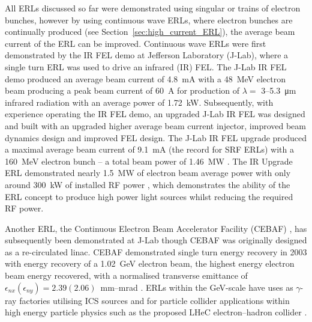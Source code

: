 \documentclass[../main.tex]{subfiles}
\begin{document}
All ERLs discussed so far were demonstrated using singular or trains of electron bunches, however by using continuous wave ERLs, where electron bunches are continually produced (see Section~\ref{sec:high_current_ERL}), the average beam current of the ERL can be improved. Continuous wave ERLs were first demonstrated \cite{neil2000sustained} by the IR FEL demo \cite{benson1999first,neil2000sustained} at Jefferson Laboratory (J-Lab), where a single turn ERL was used to drive an infrared (IR) FEL. The J-Lab IR FEL demo produced an average beam current of 4.8~\si{\milli\ampere} with a 48~\si{\mega\electronvolt} electron beam producing a peak beam current of 60~\si{\ampere} for production of $\lambda =$ 3--5.3~\si{\micro\meter} infrared radiation with an average power of 1.72~\si{\kilo\watt}. Subsequently, with experience operating the IR FEL demo, an upgraded J-Lab IR FEL was designed \cite{benson2002have} and built \cite{behre2004first} with an upgraded higher average beam current injector, improved beam dynamics design and improved FEL design. The J-Lab IR FEL upgrade produced a maximal average beam current of 9.1~\si{\milli\ampere} (the record for SRF ERLs) with a 160~\si{\mega\electronvolt} electron bunch -- a total beam power of 1.46~\si{\mega\watt} \cite{neil2006jlab}. The IR Upgrade ERL demonstrated nearly 1.5~\si{\mega\watt} of electron beam average power with only around 300~\si{\kilo\watt} of installed RF power \cite{adolphsen2022european}, which demonstrates the ability of the ERL concept to produce high power light sources whilst reducing the required RF power.  

Another ERL, the Continuous Electron Beam Accelerator Facility (CEBAF) \cite{bogacz2003cebaf,tennant2003beam}, has subsequently been demonstrated at J-Lab though CEBAF was originally designed as a re-circulated linac. CEBAF demonstrated single turn energy recovery in 2003 \cite{bogacz2003cebaf,tennant2003beam} with energy recovery of a 1.02~\si{\giga\electronvolt} electron beam, the highest energy electron beam energy recovered, with a normalised transverse emittance of $\epsilon_{nx} \left(\epsilon_{ny}\right) = 2.39 \left(2.06\right)$~\si{\milli\meter}--\si{\milli\radian} \cite{tennant2003beam}. ERLs within the \si{\giga\electronvolt}-scale have uses as $\gamma$-ray factories \cite{budker2021expanding} utilising ICS sources and for particle collider applications within high energy particle physics such as the proposed LHeC electron--hadron collider \cite{agostini2021large}. 
\end{document}
